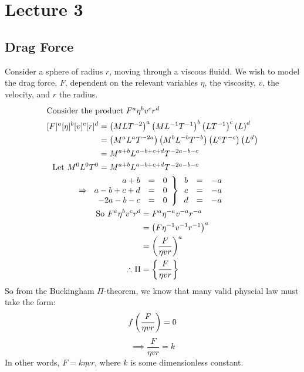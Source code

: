 \documentclass{report}
\begin{document}
\section{Lecture 3}
\subsection*{Drag Force}
Consider a sphere of radius $r$, moving through a viscous fluidd. We wish to model the drag force, $F$, dependent on the relevant variables $\eta$, the viscosity, $v$, the velocity, and $r$ the radius.
\begin{gather*}
	\intertext{Consider the product $F^a\eta^bv^cr^d$} 
	\begin{aligned}
		[F]^a[\eta]^b[v]^c[r]^d &= \bracks{MLT^{-2}}^a\bracks{ML^{-1} T^{-1}}^b\bracks{LT^{-1}}^c\bracks{L}^d \\
			&= \bracks{M^aL^aT^{-2a}}\bracks{M^bL^{-b}T^{-b}}\bracks{L^cT^{-c}}\bracks{L^d} \\
			&= M^{a+b}L^{a-b+c+d}T^{-2a-b-c} \\
		\Let M^0L^0T^0 &= M^{a+b}L^{a-b+c+d}T^{-2a-b-c}
	\end{aligned}\\
	\Rightarrow \left.\begin{array}{rcc}
		a + b & = & 0 \\
		a - b + c + d & = & 0 \\
		-2a - b - c & = & 0
	\end{array}\right\rbrace \begin{array}{ccl}
		b & = & -a \\
		c & = & -a \\
 		d & = & -a
	\end{array} \\
	\begin{aligned}
		\So F^a\eta^bv^cr^d &= F^a\eta^{-a}v^{-a}r^{-a} \\
			&= \bracks{F\eta^{-1}v^{-1}r^{-1}}^{a} \\
			&= \bracks{\frac{F}{\eta v r }}^{a} \\
		\tf \Pi &= \braces{\frac{F}{\eta v r }}
	\end{aligned}
\end{gather*}
So from the Buckingham $\Pi$-theorem, we know that many valid physcial law must take the form:
$$
	f\left( \frac{F}{\eta vr} \right) = 0
$$
$$
	\implies \frac{F}{\eta vr} = k
$$
In other words, $F = k\eta vr$, where $k$ is some dimensionless constant.

\end{document}

